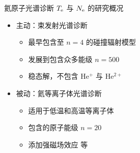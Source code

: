 \begin{CJK*}{UTF8}{kai}
\begin{frame}{氦原子光谱诊断 $T_{\rm e}$ 与 $N_{\rm e}$ 的研究概况}
	\begin{itemize}
		\item 主动：束发射光谱诊断
			\begin{itemize}
				\item 最早包含至 $n=4$ 的碰撞辐射模型 
				\item 发展到包含众多能级 $n=500$ 
				\item 稳态解，不包含 He$^+$ 与 He$^{2+}$
			\end{itemize}
		\bigskip
		\item 被动：氦等离子体光谱诊断\\ 
			\begin{itemize}
				\item 适用于低温和高温等离子体
				\item 包含的原子能级 $n=20$
				\item 添加强磁场效应 等
			\end{itemize}
	\end{itemize}
\end{frame}


\end{CJK*}

